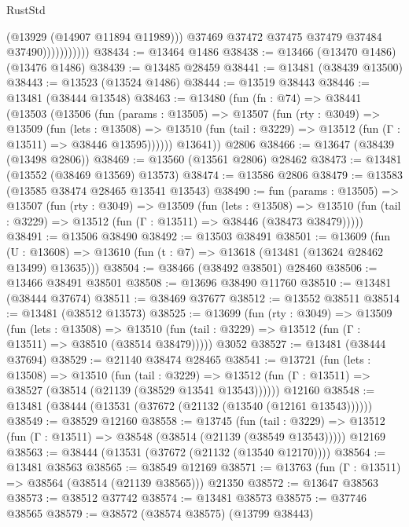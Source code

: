 \begin{lexlean}{RustStd}
\begin{coremodule}
                            (@13929 (@14907 @11894 @11989)))
                          @37469
                          @37472
                          @37475
                          @37479
                          @37484
                          @37490)))))))))))
@38434 := @13464 @1486
@38438 := @13466 (@13470 @1486) (@13476 @1486)
@38439 := @13485 @28459
@38441 := @13481 (@38439 @13500)
@38443 := @13523 (@13524 @1486)
@38444 := @13519 @38443
@38446 := @13481 (@38444 @13548)
@38463 := @13480
    (fun (fn : @74) =>
    @38441
      (@13503
        (@13506
          (fun (params : @13505) =>
          @13507
            (fun (rty : @3049) =>
            @13509
              (fun (lets : @13508) =>
              @13510 (fun (tail : @3229) => @13512 (fun (Γ : @13511) => @38446 @13595))))))
        @13641))
    @2806
@38466 := @13647 (@38439 (@13498 @2806))
@38469 := @13560 (@13561 @2806) @28462
@38473 := @13481 (@13552 (@38469 @13569) @13573)
@38474 := @13586 @2806
@38479 := @13583 (@13585 @38474 @28465 @13541 @13543)
@38490 := fun (params : @13505) =>
  @13507
    (fun (rty : @3049) =>
    @13509
      (fun (lets : @13508) =>
      @13510 (fun (tail : @3229) => @13512 (fun (Γ : @13511) => @38446 (@38473 @38479)))))
@38491 := @13506 @38490
@38492 := @13503 @38491
@38501 := @13609
    (fun (U : @13608) => @13610 (fun (t : @7) => @13618 (@13481 (@13624 @28462 @13499) @13635)))
@38504 := @38466 (@38492 @38501) @28460
@38506 := @13466 @38491 @38501
@38508 := @13696 @38490 @11760
@38510 := @13481 (@38444 @37674)
@38511 := @38469 @37677
@38512 := @13552 @38511
@38514 := @13481 (@38512 @13573)
@38525 := @13699
    (fun (rty : @3049) =>
    @13509
      (fun (lets : @13508) =>
      @13510 (fun (tail : @3229) => @13512 (fun (Γ : @13511) => @38510 (@38514 @38479)))))
    @3052
@38527 := @13481 (@38444 @37694)
@38529 := @21140 @38474 @28465
@38541 := @13721
    (fun (lets : @13508) =>
    @13510
      (fun (tail : @3229) =>
      @13512 (fun (Γ : @13511) => @38527 (@38514 (@21139 (@38529 @13541 @13543))))))
    @12160
@38548 := @13481 (@38444 (@13531 (@37672 (@21132 (@13540 (@12161 @13543))))))
@38549 := @38529 @12160
@38558 := @13745
    (fun (tail : @3229) => @13512 (fun (Γ : @13511) => @38548 (@38514 (@21139 (@38549 @13543)))))
    @12169
@38563 := @38444 (@13531 (@37672 (@21132 (@13540 @12170))))
@38564 := @13481 @38563
@38565 := @38549 @12169
@38571 := @13763 (fun (Γ : @13511) => @38564 (@38514 (@21139 @38565))) @21350
@38572 := @13647 @38563
@38573 := @38512 @37742
@38574 := @13481 @38573
@38575 := @37746 @38565
@38579 := @38572 (@38574 @38575) (@13799 @38443)

\end{coremodule}
\end{lexlean}
